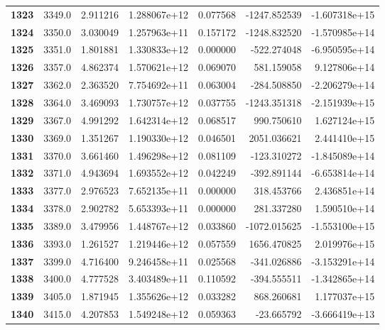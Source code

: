 \documentclass{report}[12pt]
\begin{document}
\begin{center}
\begin{tabular}{lrrrrrr}
\textbf{1323} &         3349.0 &   2.911216 &  1.288067e+12 &    0.077568 & -1247.852539 & -1.607318e+15 \\
\textbf{1324} &         3350.0 &   3.030049 &  1.257963e+11 &    0.157172 & -1248.832520 & -1.570985e+14 \\
\textbf{1325} &         3351.0 &   1.801881 &  1.330833e+12 &    0.000000 &  -522.274048 & -6.950595e+14 \\
\textbf{1326} &         3357.0 &   4.862374 &  1.570621e+12 &    0.069070 &   581.159058 &  9.127806e+14 \\
\textbf{1327} &         3362.0 &   2.363520 &  7.754692e+11 &    0.063004 &  -284.508850 & -2.206279e+14 \\
\textbf{1328} &         3364.0 &   3.469093 &  1.730757e+12 &    0.037755 & -1243.351318 & -2.151939e+15 \\
\textbf{1329} &         3367.0 &   4.991292 &  1.642314e+12 &    0.068517 &   990.750610 &  1.627124e+15 \\
\textbf{1330} &         3369.0 &   1.351267 &  1.190330e+12 &    0.046501 &  2051.036621 &  2.441410e+15 \\
\textbf{1331} &         3370.0 &   3.661460 &  1.496298e+12 &    0.081109 &  -123.310272 & -1.845089e+14 \\
\textbf{1332} &         3371.0 &   4.943694 &  1.693552e+12 &    0.042249 &  -392.891144 & -6.653814e+14 \\
\textbf{1333} &         3377.0 &   2.976523 &  7.652135e+11 &    0.000000 &   318.453766 &  2.436851e+14 \\
\textbf{1334} &         3378.0 &   2.902782 &  5.653393e+11 &    0.000000 &   281.337280 &  1.590510e+14 \\
\textbf{1335} &         3389.0 &   3.479956 &  1.448767e+12 &    0.033860 & -1072.015625 & -1.553100e+15 \\
\textbf{1336} &         3393.0 &   1.261527 &  1.219446e+12 &    0.057559 &  1656.470825 &  2.019976e+15 \\
\textbf{1337} &         3399.0 &   4.716400 &  9.246458e+11 &    0.025568 &  -341.026886 & -3.153291e+14 \\
\textbf{1338} &         3400.0 &   4.777528 &  3.403489e+11 &    0.110592 &  -394.555511 & -1.342865e+14 \\
\textbf{1339} &         3405.0 &   1.871945 &  1.355626e+12 &    0.033282 &   868.260681 &  1.177037e+15 \\
\textbf{1340} &         3415.0 &   4.207853 &  1.549248e+12 &    0.059363 &   -23.665792 & -3.666419e+13 \\

\end{tabular}
\end{center}
\end{document}
